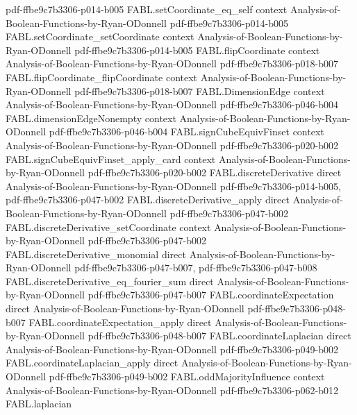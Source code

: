 \begin{theorem}
  {pdf-ffbe9c7b3306-p014-b005}
\proofstep
  {FABL.setCoordinate_eq_self}
  {context}
  {Analysis-of-Boolean-Functions-by-Ryan-ODonnell}
  {pdf-ffbe9c7b3306-p014-b005}
\proofstep
  {FABL.setCoordinate_setCoordinate}
  {context}
  {Analysis-of-Boolean-Functions-by-Ryan-ODonnell}
  {pdf-ffbe9c7b3306-p014-b005}
\proofstep
  {FABL.flipCoordinate}
  {context}
  {Analysis-of-Boolean-Functions-by-Ryan-ODonnell}
  {pdf-ffbe9c7b3306-p018-b007}
\proofstep
  {FABL.flipCoordinate_flipCoordinate}
  {context}
  {Analysis-of-Boolean-Functions-by-Ryan-ODonnell}
  {pdf-ffbe9c7b3306-p018-b007}
\proofstep
  {FABL.DimensionEdge}
  {context}
  {Analysis-of-Boolean-Functions-by-Ryan-ODonnell}
  {pdf-ffbe9c7b3306-p046-b004}
\proofstep
  {FABL.dimensionEdgeNonempty}
  {context}
  {Analysis-of-Boolean-Functions-by-Ryan-ODonnell}
  {pdf-ffbe9c7b3306-p046-b004}
\proofstep
  {FABL.signCubeEquivFinset}
  {context}
  {Analysis-of-Boolean-Functions-by-Ryan-ODonnell}
  {pdf-ffbe9c7b3306-p020-b002}
\proofstep
  {FABL.signCubeEquivFinset_apply_card}
  {context}
  {Analysis-of-Boolean-Functions-by-Ryan-ODonnell}
  {pdf-ffbe9c7b3306-p020-b002}
\proofstep
  {FABL.discreteDerivative}
  {direct}
  {Analysis-of-Boolean-Functions-by-Ryan-ODonnell}
  {pdf-ffbe9c7b3306-p014-b005,
    pdf-ffbe9c7b3306-p047-b002}
\proofstep
  {FABL.discreteDerivative_apply}
  {direct}
  {Analysis-of-Boolean-Functions-by-Ryan-ODonnell}
  {pdf-ffbe9c7b3306-p047-b002}
\proofstep
  {FABL.discreteDerivative_setCoordinate}
  {context}
  {Analysis-of-Boolean-Functions-by-Ryan-ODonnell}
  {pdf-ffbe9c7b3306-p047-b002}
\proofstep
  {FABL.discreteDerivative_monomial}
  {direct}
  {Analysis-of-Boolean-Functions-by-Ryan-ODonnell}
  {pdf-ffbe9c7b3306-p047-b007,
    pdf-ffbe9c7b3306-p047-b008}
\proofstep
  {FABL.discreteDerivative_eq_fourier_sum}
  {direct}
  {Analysis-of-Boolean-Functions-by-Ryan-ODonnell}
  {pdf-ffbe9c7b3306-p047-b007}
\proofstep
  {FABL.coordinateExpectation}
  {direct}
  {Analysis-of-Boolean-Functions-by-Ryan-ODonnell}
  {pdf-ffbe9c7b3306-p048-b007}
\proofstep
  {FABL.coordinateExpectation_apply}
  {direct}
  {Analysis-of-Boolean-Functions-by-Ryan-ODonnell}
  {pdf-ffbe9c7b3306-p048-b007}
\proofstep
  {FABL.coordinateLaplacian}
  {direct}
  {Analysis-of-Boolean-Functions-by-Ryan-ODonnell}
  {pdf-ffbe9c7b3306-p049-b002}
\proofstep
  {FABL.coordinateLaplacian_apply}
  {direct}
  {Analysis-of-Boolean-Functions-by-Ryan-ODonnell}
  {pdf-ffbe9c7b3306-p049-b002}
\proofstep
  {FABL.oddMajorityInfluence}
  {context}
  {Analysis-of-Boolean-Functions-by-Ryan-ODonnell}
  {pdf-ffbe9c7b3306-p062-b012}
\proofstep
  {FABL.laplacian}

\end{theorem}
